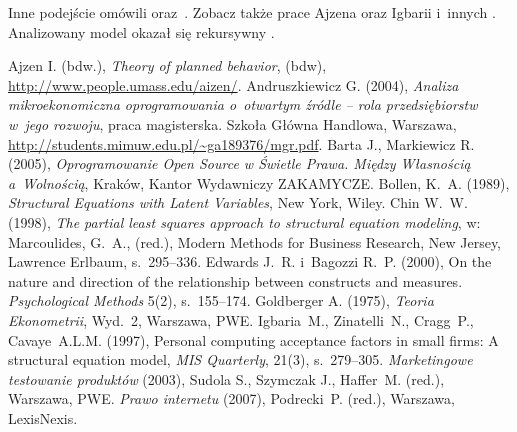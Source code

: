 \documentclass{report}
\begin{document}
Inne podejście omówili \cite{Chin1998,Igbaria1997} oraz~\cite{Ajzen-tpb}. 
Zobacz także prace Ajzena \citeyearpar{Ajzen-tpb} oraz Igbarii 
i~innych \citeyearpar{Igbaria1997}. 
Analizowany model okazał się rekursywny \cite{Bollen89}.

\begin{thebibliography}{}
  Ajzen I. (bdw.), \emph{Theory of 
 planned behavior\/}, (bdw), \url{http://www.people.umass.edu/aizen/}.
  Andruszkiewicz G. 
 (2004), \emph{Analiza mikroekonomiczna oprogramowania o~otwartym 
 źródle -- rola przedsiębiorstw w~jego rozwoju}, praca magisterska. 
 Szkoła Główna Handlowa, Warszawa,
 \url{http://students.mimuw.edu.pl/~ga189376/mgr.pdf}.
  Barta J., 
 Markiewicz R. (2005), \emph{Oprogramowanie Open Source w Świetle Prawa. 
 Między Własnością a~Wolnością}, Kraków, Kantor Wydawniczy ZAKAMYCZE.
  Bollen, K.~A. (1989), \emph{Structural 
 Equations with Latent Variables}, New York, Wiley.
  Chin W.~W. (1998), \emph{The partial 
 least squares approach to structural equation modeling\/}, 
 w: Marcoulides, G.~A., (red.), Modern Methods for Business Research, 
 New Jersey, Lawrence Erlbaum, s.~295--336. 
  Edwards J.~R. 
 i~Bagozzi R.~P. (2000), On the nature and 
 direction of the relationship between constructs and measures. 
 \emph{Psychological Methods\/} 5(2), s.~155--174.
  Goldberger A. (1975), 
 \emph{Teoria Ekonometrii\/}, Wyd.~2, Warszawa, PWE.
  Igbaria~M., Zinatelli~N., 
 Cragg~P., Cavaye~A.L.M. (1997),  Personal computing acceptance factors 
 in small firms: A structural equation model, 
 \emph{MIS Quarterly}, 21(3), s.~279--305.
 \emph{Marketingowe testowanie produktów} (2003), Sudola S., 
 Szymczak J., Haffer~M. (red.), Warszawa, PWE.
 \emph{Prawo internetu\/} (2007), 
 Podrecki~P. (red.), Warszawa, LexisNexis.
\end{thebibliography}
\end{document}
